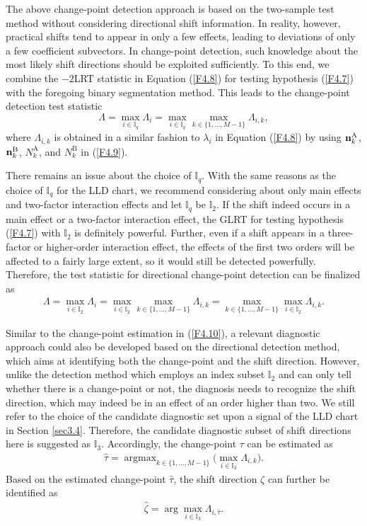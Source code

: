 The above change-point detection approach is based on the two-sample test method
without considering directional shift information. In reality, however, practical
shifts tend to appear in only a few effects, leading to deviations of only a few
coefficient subvectors. In change-point detection, such knowledge about the most
likely shift directions should be exploited sufficiently. To this end, we combine
the $-2$LRT statistic in Equation (\ref{F4.8}) for testing hypothesis (\ref{F4.7})
with the foregoing binary segmentation method. This leads to the change-point
detection test statistic
\[
\Lambda=\max_{i\in\mathbb{I}_q}\Lambda_i=\max_{i\in\mathbb{I}_q}\max_{k\in\{1,\ldots,M-1\}}\Lambda_{i,k},
\]
where $\Lambda_{i,k}$ is obtained in a similar fashion to $\lambda_i$ in Equation
(\ref{F4.8}) by using ${\bf n}^{\mathrm{A}}_k$, ${\bf n}^{\mathrm{B}}_k$,
$N^{\mathrm{A}}_k$, and $N^{\mathrm{B}}_k$ in (\ref{F4.9}).

There remains an issue about the choice of $\mathbb{I}_q$. With the same reasons as
the choice of $\mathbb{I}_q$ for the LLD chart, we recommend considering about only
main effects and two-factor interaction effects and let $\mathbb{I}_q$ be
$\mathbb{I}_2$. If the shift indeed occurs in a main effect or a two-factor
interaction effect, the GLRT for testing hypothesis (\ref{F4.7}) with $\mathbb{I}_2$
is definitely powerful. Further, even if a shift appears in a three-factor or
higher-order interaction effect, the effects of the first two orders will be
affected to a fairly large extent, so it would still be detected powerfully.
Therefore, the test statistic for directional change-point detection can be
finalized as
\begin{align}
\Lambda=\max_{i\in\mathbb{I}_2}\Lambda_i
=\max_{i\in\mathbb{I}_2}\max_{k\in\{1,\ldots,M-1\}}\Lambda_{i,k}
=\max_{k\in\{1,\ldots,M-1\}}\max_{i\in\mathbb{I}_2}\Lambda_{i,k}.\label{F4.11}
\end{align}

Similar to the change-point estimation in (\ref{F4.10}), a relevant diagnostic
approach could also be developed based on the directional detection method, which
aims at identifying both the change-point and the shift direction. However, unlike
the detection method which employs an index subset $\mathbb{I}_2$ and can only tell
whether there is a change-point or not, the diagnosis needs to recognize the shift
direction, which may indeed be in an effect of an order higher than two. We still
refer to the choice of the candidate diagnostic set upon a signal of the LLD chart
in Section \ref{sec3.4}. Therefore, the candidate diagnostic subset of shift
directions here is suggested as $\mathbb{I}_3$. Accordingly, the change-point $\tau$
can be estimated as
\begin{align}
\hat{\tau}=\mathop{\arg\max}_{k\in\{1,\ldots,M-1\}}\Big(\max_{i\in\mathbb{I}_3}\Lambda_{i,k}\Big).\label{F4.12}
\end{align}
Based on the estimated change-point $\hat{\tau}$, the shift direction $\zeta$ can
further be identified as
\begin{align}
\hat{\zeta}=\arg\max_{i\in\mathbb{I}_3}\Lambda_{i,\hat{\tau}}.\label{F4.13}
\end{align}



